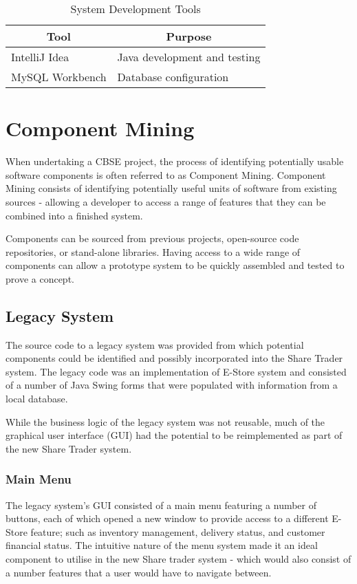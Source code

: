 \documentclass[12pt, a4paper,titlepage]{article}
\begin{document}
\begin{table}[h]
    \centering
    \begin{tabular}{|l|l|}
        \hline
        \multicolumn{1}{|c|}{\textbf{Tool}} &
        \multicolumn{1}{c|}{\textbf{Purpose}} \\ \hline
        IntelliJ Idea                       & Java development and testing
        \\ \hline
        MySQL Workbench                     & Database configuration
        \\ \hline
    \end{tabular}
    \caption{System Development Tools}
    \label{table-tool}
\end{table}


\section{Component Mining}
When undertaking a CBSE project, the process of identifying potentially usable
software components is often referred to as Component Mining.  
Component Mining consists of identifying potentially useful units of software
from existing sources - allowing a developer to access a range of features
that they can be combined into a finished system.

Components can be sourced from previous projects, open-source code
repositories, or stand-alone libraries. 
Having access to a wide range of components can allow a prototype system to be
quickly assembled and tested to prove a concept.

\subsection{Legacy System}
The source code to a legacy system was provided from which potential
components could be identified and possibly incorporated into the Share Trader
system.  
The legacy code was an implementation of E-Store system and consisted of a
number of Java Swing forms that were populated with information from a local
database.

While the business logic of the legacy system was not reusable, much of the
graphical user interface (GUI) had the potential to be reimplemented as part of
the new Share Trader system.

\subsubsection{Main Menu}
The legacy system’s GUI consisted of a main menu featuring a number of
buttons, each of which opened a new window to provide access to a different
E-Store feature; such as inventory management, delivery status, and customer
financial status.  
The intuitive nature of the menu system made it an ideal component to utilise
in the new Share trader system - which would also consist of a number features
that a user would have to navigate between.
\end{document}
